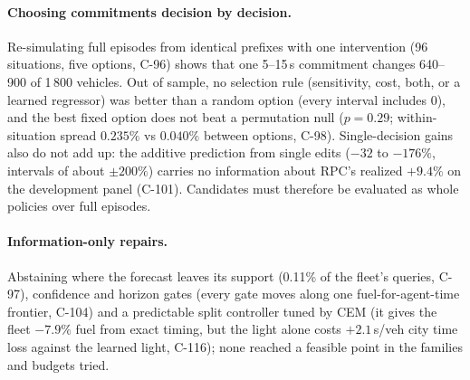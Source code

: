 \documentclass[11pt]{article}
\begin{document}
\paragraph{Choosing commitments decision by decision.} Re-simulating full episodes from identical prefixes with one intervention
(96 situations, five options, C-96) shows that one 5--15\,s commitment changes 640--900 of 1\,800 vehicles. Out of sample, no selection
rule (sensitivity, cost, both, or a learned regressor) was better than a random option (every interval includes 0), and the best fixed option does not beat a permutation null
($p=0.29$; within-situation spread $0.235\%$ vs $0.040\%$ between options, C-98). Single-decision gains also do not add up: the
additive prediction from single edits ($-32$ to $-176\%$, intervals of about $\pm200\%$) carries no information about RPC's realized
$+9.4\%$ on the development panel (C-101). Candidates must therefore be evaluated as
whole policies over full episodes.
\paragraph{Information-only repairs.} Abstaining where the forecast leaves its support (0.11\% of the fleet's queries, C-97), confidence and
horizon gates (every gate moves along one fuel-for-agent-time frontier, C-104) and a predictable split controller tuned by CEM (it gives the
fleet $-7.9\%$ fuel from exact timing, but the light alone costs $+2.1$\,s/veh city time loss against the learned light, C-116); none
reached a feasible point in the families and budgets tried.
\end{document}
